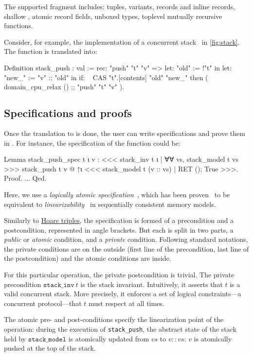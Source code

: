 The supported \OCaml fragment includes: tuples, variants, records and inline records, shallow , atomic record fields, unboxed types, toplevel mutually recursive functions.

Consider, for example, the \OCaml implementation of a concurrent stack~\cite{thomas1986systems} in \cref{fig:stack}.
The  function is translated into:

\begin{coqcode}
Definition stack_push : val := rec: "push" "t" "v" =>
  let: "old" := !"t" in
  let: "new_" := "v" :: "old" in
  if: ~ CAS "t".[contents] "old" "new_" then (
    domain_cpu_relax () ;;
    "push" "t" "v" ).
\end{coqcode}

\subsection{Specifications and proofs}

Once the translation to \ZooLang is done, the user can write specifications and prove them in \Iris.
For instance, the specification of the  function could be:

\begin{coqcode}
Lemma stack_push_spec t ι v :
  <<< stack_inv t ι
    | ∀∀ vs, stack_model t vs >>>
    stack_push t v @ ↑ι
  <<< stack_model t (v :: vs)
    | RET (); True >>>.
Proof. ... Qed.
\end{coqcode}

Here, we use a \emph{logically atomic specification}~\cite{DBLP:conf/ecoop/PintoDG14}, which has been proven~\cite{DBLP:journals/pacmpl/BirkedalDGJST21} to be equivalent to \emph{linearizability}~\cite{DBLP:journals/toplas/HerlihyW90} in sequentially consistent memory models.

Similarly to \href{https://en.wikipedia.org/wiki/Hoare_logic}{Hoare triples},
the specification is formed of a precondition and a postcondition, represented in angle brackets.
But each is split in two parts, a \emph{public} or \emph{atomic} condition, and a \emph{private} condition.
Following standard \Iris notations, the private conditions are on the outside (first line of the precondition, last line of the postcondition) and the atomic conditions are inside.

For this particular operation, the private postcondition is trivial.
The private precondition $\mathtt{stack\_inv}\ t$ is the stack invariant.
Intuitively, it asserts that $t$ is a valid concurrent stack.
More precisely, it enforces a set of logical constraints---a concurrent protocol---that $t$ must respect at all times.

The atomic pre- and post-conditions specify the linearization point of the operation: during the execution of \texttt{stack\_push}, the abstract state of the stack held by $\mathtt{stack\_model}$ is atomically updated from $\mathit{vs}$ to $v :: \mathit{vs}$: $v$ is atomically pushed at the top of the stack.

